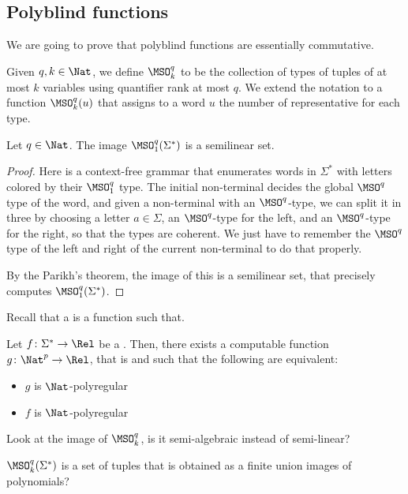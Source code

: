 
\subsection{Polyblind functions}

We are going to prove that polyblind functions are essentially
commutative.

\AP Given $q,k \in \Nat$, we define $\MSO^q_k$ to be the collection of types of
tuples of at most $k$ variables using quantifier rank at most $q$. We extend
the notation to a function $\MSO^q_k (u)$ that assigns to a word $u$ the number
of representative for each type.

\begin{lemma}
    Let $q \in \Nat$. The image
    $\MSO^q_1(\Sigma^*)$ is a semilinear set.
\end{lemma}
\begin{proof}
    Here is a context-free grammar that enumerates words
    in $\Sigma^*$ with letters colored by their $\MSO^q_1$ type.
    The initial non-terminal decides the global $\MSO^q$ type of the word,
    and given a non-terminal with an $\MSO^q$-type, we can split it in three
    by choosing a letter $a \in \Sigma$, an $\MSO^q$-type for the left,
    and an $\MSO^q$-type for the right, so that the types are coherent.
    We just have to remember the $\MSO^q$ type of the left and right
    of the current non-terminal to do that properly.

    By the Parikh’s theorem, the image of this is a semilinear set, that
    precisely computes $\MSO^q_1(\Sigma^*)$.
\end{proof}

\AP
Recall that a  is a function such that.

\begin{lemma}
    Let $f \colon \Sigma^* \to \Rel$ be a .
    Then, there exists a computable function $g \colon \Nat^p \to \Rel$,
    that is  and such that the following are equivalent:
    \begin{itemize}
        \item $g$ is $\Nat$-polyregular
        \item $f$ is $\Nat$-polyregular
    \end{itemize}
\end{lemma}

\AP
Look at the image of $\MSO^q_k$, is it semi-algebraic instead of semi-linear?
\begin{lemma}
    $\MSO^q_k(\Sigma^*)$ is a set of tuples that is obtained as a finite union 
    images of polynomials?
\end{lemma}

